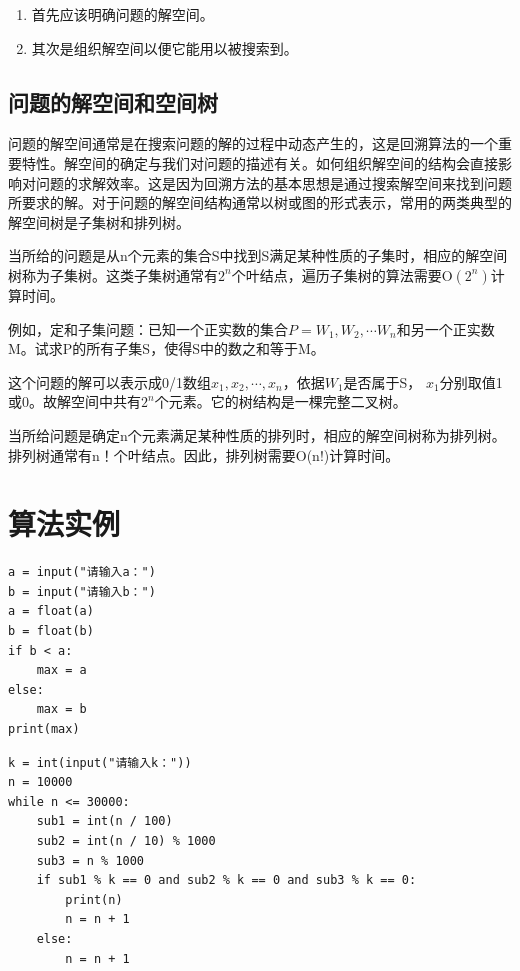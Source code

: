 \begin{enumerate}
    \item 首先应该明确问题的解空间。
    \item 其次是组织解空间以便它能用以被搜索到。
\end{enumerate}

\subsection{问题的解空间和空间树}

问题的解空间通常是在搜索问题的解的过程中动态产生的，这是回溯算法的一个重要特性。解空间的确定与我们对问题的描述有关。如何组织解空间的结构会直接影响对问题的求解效率。这是因为回溯方法的基本思想是通过搜索解空间来找到问题所要求的解。对于问题的解空间结构通常以树或图的形式表示，常用的两类典型的解空间树是子集树和排列树。

{\bfseries {}}

当所给的问题是从n个元素的集合S中找到S满足某种性质的子集时，相应的解空间树称为子集树。这类子集树通常有$2^n$个叶结点，遍历子集树的算法需要O$(2^n)$计算时间。

例如，定和子集问题：已知一个正实数的集合$P= {W_1,W_2, \cdots W_n}$和另一个正实数M。试求P的所有子集S，使得S中的数之和等于M。

这个问题的解可以表示成0/1数组${x_1,x_2,\cdots,x_n}$，依据$W_1$是否属于S， $x_1$分别取值1或0。故解空间中共有$2^n$个元素。它的树结构是一棵完整二叉树。 

{\bfseries {}}

当所给问题是确定n个元素满足某种性质的排列时，相应的解空间树称为排列树。排列树通常有n！个叶结点。因此，排列树需要O(n!)计算时间。















\newpage
\section{算法实例}
\begin{lstlisting}[caption = 求最大值]
a = input("请输入a：")
b = input("请输入b：")
a = float(a)
b = float(b)
if b < a:
    max = a
else:
    max = b
print(max)
\end{lstlisting}


\begin{lstlisting}[caption = 枚举算法]
k = int(input("请输入k："))
n = 10000
while n <= 30000:
    sub1 = int(n / 100)
    sub2 = int(n / 10) % 1000
    sub3 = n % 1000
    if sub1 % k == 0 and sub2 % k == 0 and sub3 % k == 0:
        print(n)
        n = n + 1
    else:
        n = n + 1
\end{lstlisting}


